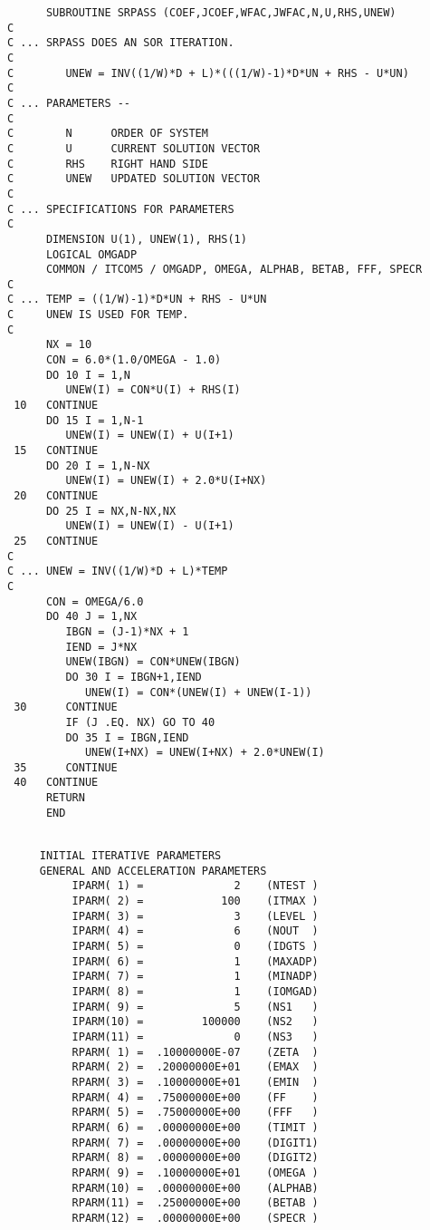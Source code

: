 \begin{verbatim}
      SUBROUTINE SRPASS (COEF,JCOEF,WFAC,JWFAC,N,U,RHS,UNEW)
C
C ... SRPASS DOES AN SOR ITERATION.
C
C        UNEW = INV((1/W)*D + L)*(((1/W)-1)*D*UN + RHS - U*UN)
C
C ... PARAMETERS -- 
C
C        N      ORDER OF SYSTEM
C        U      CURRENT SOLUTION VECTOR 
C        RHS    RIGHT HAND SIDE
C        UNEW   UPDATED SOLUTION VECTOR 
C
C ... SPECIFICATIONS FOR PARAMETERS
C
      DIMENSION U(1), UNEW(1), RHS(1)
      LOGICAL OMGADP
      COMMON / ITCOM5 / OMGADP, OMEGA, ALPHAB, BETAB, FFF, SPECR
C
C ... TEMP = ((1/W)-1)*D*UN + RHS - U*UN
C     UNEW IS USED FOR TEMP.
C
      NX = 10
      CON = 6.0*(1.0/OMEGA - 1.0)
      DO 10 I = 1,N 
         UNEW(I) = CON*U(I) + RHS(I)
 10   CONTINUE
      DO 15 I = 1,N-1
         UNEW(I) = UNEW(I) + U(I+1)
 15   CONTINUE
      DO 20 I = 1,N-NX
         UNEW(I) = UNEW(I) + 2.0*U(I+NX)
 20   CONTINUE
      DO 25 I = NX,N-NX,NX
         UNEW(I) = UNEW(I) - U(I+1)
 25   CONTINUE
C
C ... UNEW = INV((1/W)*D + L)*TEMP
C
      CON = OMEGA/6.0
      DO 40 J = 1,NX
         IBGN = (J-1)*NX + 1
         IEND = J*NX
         UNEW(IBGN) = CON*UNEW(IBGN)
         DO 30 I = IBGN+1,IEND
            UNEW(I) = CON*(UNEW(I) + UNEW(I-1))
 30      CONTINUE
         IF (J .EQ. NX) GO TO 40
         DO 35 I = IBGN,IEND
            UNEW(I+NX) = UNEW(I+NX) + 2.0*UNEW(I) 
 35      CONTINUE
 40   CONTINUE
      RETURN
      END 
\end{verbatim}
\newpage
\begin{verbatim}
 
     INITIAL ITERATIVE PARAMETERS
     GENERAL AND ACCELERATION PARAMETERS
          IPARM( 1) =              2    (NTEST )
          IPARM( 2) =            100    (ITMAX )
          IPARM( 3) =              3    (LEVEL )
          IPARM( 4) =              6    (NOUT  )
          IPARM( 5) =              0    (IDGTS )
          IPARM( 6) =              1    (MAXADP)
          IPARM( 7) =              1    (MINADP)
          IPARM( 8) =              1    (IOMGAD)
          IPARM( 9) =              5    (NS1   )
          IPARM(10) =         100000    (NS2   )
          IPARM(11) =              0    (NS3   )
          RPARM( 1) =  .10000000E-07    (ZETA  )
          RPARM( 2) =  .20000000E+01    (EMAX  )
          RPARM( 3) =  .10000000E+01    (EMIN  )
          RPARM( 4) =  .75000000E+00    (FF    )
          RPARM( 5) =  .75000000E+00    (FFF   )
          RPARM( 6) =  .00000000E+00    (TIMIT )
          RPARM( 7) =  .00000000E+00    (DIGIT1)
          RPARM( 8) =  .00000000E+00    (DIGIT2)
          RPARM( 9) =  .10000000E+01    (OMEGA )
          RPARM(10) =  .00000000E+00    (ALPHAB)
          RPARM(11) =  .25000000E+00    (BETAB )
          RPARM(12) =  .00000000E+00    (SPECR )
\end{verbatim}

